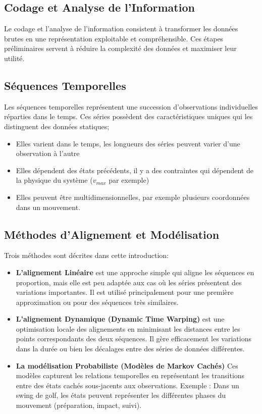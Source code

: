 \documentclass[a4paper,12pt,oneside]{report}	%
\begin{document}
        \subsection{Codage et Analyse de l’Information}
            Le codage et l’analyse de l’information consistent à transformer les données brutes en une représentation exploitable et compréhensible. Ces étapes préliminaires servent à réduire la complexité des données et maximiser leur utilité.
        \subsection{Séquences Temporelles}
            Les séquences temporelles représentent une succession d'observations individuelles réparties dans le temps. Ces séries possèdent des caractéristiques uniques qui les distinguent des données statiques;
            \begin{itemize}
                \item Elles varient dans le temps, les longueurs des séries peuvent varier d'une observation à l'autre
                \item Elles dépendent des états précédents, il y a des contraintes qui dépendent de la physique du système ($v_{max}$ par exemple)
                \item Elles peuvent être multidimensionnelles, par exemple plusieurs coordonnées dans un mouvement.
            \end{itemize}
        \subsection{Méthodes d'Alignement et Modélisation}
            Trois méthodes sont décrites dans cette introduction:
            \begin{itemize}
                \item \textbf{L'alignement Linéaire} est une approche simple qui aligne les séquences en proportion, mais elle est peu adaptée aux cas où les séries présentent des variations importantes. Il est utilisé principalement pour une première approximation ou pour des séquences très similaires.
                \item \textbf{L'alignement Dynamique (Dynamic Time Warping)} est une optimisation locale des alignements en minimisant les distances entre les points correspondants des deux séquences. Il gère efficacement les variations dans la durée ou bien les décalages entre des séries de données différentes.
                \item \textbf{La modélisation Probabiliste (Modèles de Markov Cachés)} Ces modèles capturent les relations temporelles en représentant les transitions entre des états cachés sous-jacents aux observations. Exemple : Dans un swing de golf, les états peuvent représenter les différentes phases du mouvement (préparation, impact, suivi).
            \end{itemize}
\end{document}
